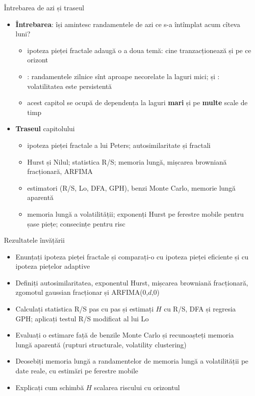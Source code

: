 \begin{frame}{Întrebarea de azi și traseul}
\itemsize{\small}
\begin{itemize}
    \item \textbf{Întrebarea}: își amintesc randamentele de azi ce s-a întîmplat acum cîteva luni?
    \begin{itemize}
        \item ipoteza pieței fractale adaugă o a doua temă: cine tranzacționează și pe ce orizont
        \item {}: randamentele zilnice sînt aproape necorelate la laguri mici;  și : volatilitatea este persistentă
        \item acest capitol se ocupă de dependența la laguri \textbf{mari} și pe \textbf{multe} scale de timp
    \end{itemize}
    \item \textbf{Traseul} capitolului
    \begin{itemize}
        \item ipoteza pieței fractale a lui Peters; autosimilaritate și fractali
        \item Hurst și Nilul; statistica R/S; memoria lungă, mișcarea browniană fracționară, ARFIMA
        \item estimatori (R/S, Lo, DFA, GPH), benzi Monte Carlo, memorie lungă aparentă
        \item memoria lungă a volatilității; exponenți Hurst pe ferestre mobile pentru șase piețe; consecințe pentru risc
    \end{itemize}
\end{itemize}
\end{frame}

\begin{frame}{Rezultatele învățării}
\itemsize{\small}
\begin{itemize}
    \item Enunțați ipoteza pieței fractale și comparați-o cu ipoteza pieței eficiente și cu ipoteza piețelor adaptive
    \item Definiți autosimilaritatea, exponentul Hurst, mișcarea browniană fracționară, zgomotul gaussian fracționar și ARFIMA(0,$d$,0)
    \item Calculați statistica R/S pas cu pas și estimați $H$ cu R/S, DFA și regresia GPH; aplicați testul R/S modificat al lui Lo
    \item Evaluați o estimare față de benzile Monte Carlo și recunoașteți memoria lungă aparentă (rupturi structurale, volatility clustering)
    \item Deosebiți memoria lungă a randamentelor de memoria lungă a volatilității pe date reale, cu estimări pe ferestre mobile
    \item Explicați cum schimbă $H$ scalarea riscului cu orizontul
\end{itemize}
\end{frame}

